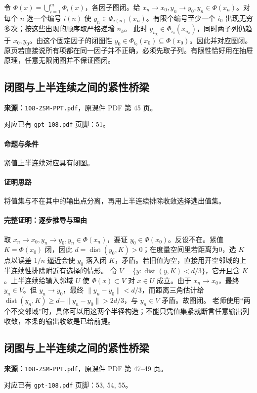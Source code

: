 令 $\Phi(x)=\bigcup_{i=1}^m\Phi_i(x)$，各因子图闭。给 $x_n\to x_0,y_n\to y_0,y_n\in\Phi(x_n)$。对每个 $n$ 选一个编号 $i(n)$ 使 $y_n\in\Phi_{i(n)}(x_n)$。有限个编号至少一个 $i_0$ 出现无穷多次；按这些出现的顺序取严格递增 $n_k$。
此时 $y_{n_k}\in\Phi_{i_0}(x_{n_k})$，同时两子列仍趋于 $x_0,y_0$。由这个固定因子的闭图性 $y_0\in\Phi_{i_0}(x_0)\subseteq\Phi(x_0)$。因此并对应图闭。
原页若直接说所有项都在同一因子并不正确，必须先取子列。有限性恰好用在抽屉原理，任意无限闭图并不保证图闭。

\clearpage\subsection{闭图与上半连续之间的紧性桥梁}
\textbf{来源：}\texttt{108-ZSM-PPT.pdf}，原课件 PDF 第 45 页。\par
对应已有 \texttt{gpt-108.pdf} 页脚：51。\par
\paragraph{命题与条件}紧值上半连续对应具有闭图。
\paragraph{证明思路}将值集与不在其中的输出点分离，再用上半连续排除收敛选择逃出值集。
\paragraph{完整证明：逐步推导与理由}

取 $x_n\to x_0,y_n\to y_0,y_n\in\Phi(x_n)$，要证 $y_0\in\Phi(x_0)$。反设不在。紧值 $K=\Phi(x_0)$ 闭，因此 $d=\operatorname{dist}(y_0,K)>0$；在度量空间里若距离为0，选 $K$ 点以误差 $1/n$ 逼近会使 $y_0$ 落入闭 $K$，矛盾。若旧值为空，直接用开空邻域的上半连续性排除附近有选择的情形。
令 $V=\{y:\operatorname{dist}(y,K)<d/3\}$，它开且含 $K$。上半连续给输入邻域 $U$ 使 $\Phi(x)\subset V$ 对 $x\in U$ 成立。由于 $x_n\to x_0$，最终 $y_n\in V$。但 $y_n\to y_0$，最终 $\|y_n-y_0\|<d/3$，而距离三角估计给 $\operatorname{dist}(y_n,K)\ge d-\|y_n-y_0\|>2d/3$，与 $y_n\in V$ 矛盾。故图闭。
老师使用“两个不交邻域”时，具体可以用这两个半径构造；不能只凭值集紧就断言任意输出列收敛，本条的输出收敛是已给前提。

\clearpage\subsection{闭图与上半连续之间的紧性桥梁}
\textbf{来源：}\texttt{108-ZSM-PPT.pdf}，原课件 PDF 第 47--49 页。\par
对应已有 \texttt{gpt-108.pdf} 页脚：53, 54, 55。\par
